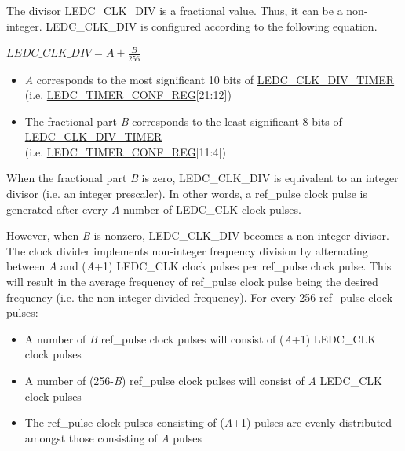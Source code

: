 \documentclass[main\_\_EN.tex]{subfiles}
\begin{document}
The divisor LEDC\_CLK\_DIV is a fractional value. Thus, it can be a  non-integer. LEDC\_CLK\_DIV  is configured  according to the following equation.

\begin{center}
$LEDC\_CLK\_DIV  = A + \frac{B}{256}$
\end{center}

\begin{itemize}
    \item \textit{A} corresponds to the most significant 10 bits of \hyperref[fielddesc:LEDCCLKDIVTIMERX]{LEDC\_CLK\_DIV\_TIMER} (i.e. \hyperref[regdesc:LEDCTIMERXCONFREG]{LEDC\_TIMER\_CONF\_REG}[21:12])
    \item The fractional part \textit{B} corresponds to the least significant 8 bits of \hyperref[fielddesc:LEDCCLKDIVTIMERX]{LEDC\_CLK\_DIV\_TIMER} \\(i.e. \hyperref[regdesc:LEDCTIMERXCONFREG]{LEDC\_TIMER\_CONF\_REG}[11:4])
\end{itemize}

When the fractional part \textit{B} is zero, LEDC\_CLK\_DIV  is equivalent to an integer divisor (i.e. an integer prescaler). In other words, a ref\_pulse clock pulse is generated after every \textit{A} number of LEDC\_CLK clock pulses.

However, when \textit{B} is nonzero, LEDC\_CLK\_DIV  becomes a non-integer divisor. The clock divider implements non-integer frequency division by alternating between \textit{A} and (\textit{A}+1) LEDC\_CLK clock pulses per ref\_pulse clock pulse. This will result in the average frequency of ref\_pulse clock pulse being the desired frequency (i.e. the non-integer divided frequency). For every 256 ref\_pulse clock pulses:

\begin{itemize}
    \item A number of \textit{B} ref\_pulse clock pulses will consist of (\textit{A}+1) LEDC\_CLK clock pulses
    \item A number of (256-\textit{B}) ref\_pulse clock pulses will consist of \textit{A} LEDC\_CLK clock pulses
    \item The ref\_pulse clock pulses consisting of (\textit{A}+1) pulses are evenly distributed amongst those consisting of \textit{A} pulses
\end{itemize}
\end{document}
